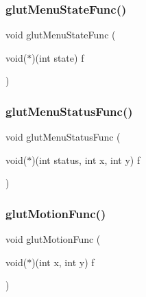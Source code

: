 \subsubsection{\texorpdfstring{glut\+Menu\+State\+Func()}{glutMenuStateFunc()}}
{\footnotesize\ttfamily void glut\+Menu\+State\+Func (\begin{DoxyParamCaption}\item[{void($\ast$)(int state)}]{f }\end{DoxyParamCaption})\hspace{0.3cm}{\ttfamily [inline]}}

\mbox{\label{glut_8_h_aca2c6e0f05e0cb18ac98f1462405e940}} 
\subsubsection{\texorpdfstring{glut\+Menu\+Status\+Func()}{glutMenuStatusFunc()}}
{\footnotesize\ttfamily void glut\+Menu\+Status\+Func (\begin{DoxyParamCaption}\item[{void($\ast$)(int status, int x, int y)}]{f }\end{DoxyParamCaption})\hspace{0.3cm}{\ttfamily [inline]}}

\mbox{\label{glut_8_h_a16aaf9a4db2edc2ee9bfd90aaea36003}} 
\subsubsection{\texorpdfstring{glut\+Motion\+Func()}{glutMotionFunc()}}
{\footnotesize\ttfamily void glut\+Motion\+Func (\begin{DoxyParamCaption}\item[{void($\ast$)(int x, int y)}]{f }\end{DoxyParamCaption})\hspace{0.3cm}{\ttfamily [inline]}}

\mbox{\label{glut_8_h_a64d693d62272c003fde98327cfa2c499}} 

